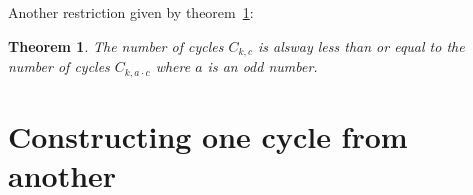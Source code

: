 \documentclass[12pt]{amsart}
\newtheorem{theorem}{Theorem}[section]
\theoremstyle{definition}
\begin{document}

\par\noindent
Another restriction given by theorem~\ref{theo:cycle_restriction_4}:

\begin{theorem}
	\label{theo:cycle_restriction_4}
	The number of cycles $C_{k,c}$ is alsway less than or equal to the number of cycles $C_{k,a\cdot c}$ where $a$ is an odd number.
\end{theorem}

\section{Constructing one cycle from another}




\vspace{1em}


\end{document}
